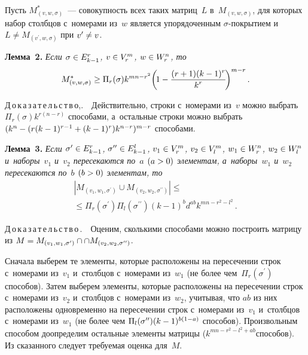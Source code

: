 \begin{multicols}{2}
    \smallskip
    
    Пусть $M_{(v,w,\sigma)}^*$~--- совокупность всех таких мат\-риц~$L$ 
в~$M_{(v,w,\sigma)}$, для которых набор столбцов с~номерами из~$w$ 
является упорядоченным $\sigma$-по\-кры\-ти\-ем и~$L\not= M_{(v^\prime, 
w,\sigma)}$ при $v^\prime\hm\not= v$. 
    
    \smallskip
    
    \noindent
    \textbf{Лемма~2.} \textit{Если $\sigma\hm\in E^r_{k-1}$, $v\hm\in V_r^m$, 
$w\hm\in W_r^n$, то} 
    $$
    M^*_{(v,w,\sigma)} \geq \Pi_r(\sigma) k^{mn-r^2}\!\left(\! 1-\displaystyle\frac{\displaystyle  (r+1)(k-
1)^r\mathstrut}{\displaystyle k^r\mathstrut}\!\right)^{m-r}.
    $$
    
    \noindent
    Д\,о\,к\,а\,з\,а\,т\,е\,л\,ь\,с\,т\,в\,о,.\ \ Действительно, строки 
с~номерами из~$v$ можно выбрать $\Pi_r(\sigma) k^{r(n-r)}$ способами, 
а~остальные строки можно выбрать $(k^n\hm- (r(k\hm-1)^{r-1} \hm+ (k\hm-
1)^r)k^{n-r})^{m-r}$ способами.
    
    \smallskip
    
    \noindent
    \textbf{Лемма~3.} \textit{Если $\sigma^\prime \hm\in E^r_{k-1}$, 
$\sigma^{\prime\prime} \hm\in E^l_{k-1}$, $v_1\hm\in V_r^m$, $v_2\hm\in 
V_l^m$, $w_1\hm\in W_r^n$, $w_2\hm\in W_l^n$ и~наборы~$v_1$ и~$v_2$ 
пересекаются по~$a$ $(a\hm>0)$ элементам, а~наборы~$w_1$ и~$w_2$ 
пересекаются по~$b$ $(b\hm>0)$ элементам, то}
\begin{multline*}
    \left\vert M_{(v_1, w_1,\sigma^\prime)} \cup 
M_{(v_2,w_2,\sigma^{\prime\prime})} \right\vert \leq{}\\
{}\leq \Pi_r(\sigma^\prime) \Pi_l 
(\sigma^{\prime\prime}) (k-1)^b d^{ab} k^{mn-r^2-l^2}\,.
    \end{multline*}
     
    \noindent
    Д\,о\,к\,а\,з\,а\,т\,е\,л\,ь\,с\,т\,в\,о\,.\ \ Оценим, сколькими способами 
можно построить матрицу из $M\hm= M_{(v_1, w_1, \sigma^\prime)}\cap\linebreak
\cap 
M_{(v_2, w_2, \sigma^{\prime\prime})}$. 
    
    Сначала выберем те элементы, которые расположены на пересечении 
строк с~номерами из~$v_1$ и~столбцов с~номерами из~$w_1$ (не более 
чем~$\Pi_r(\sigma^\prime)$ способов). Затем  выберем элементы, которые 
расположены на пересечении строк с~номерами из~$v_2$ и~столбцов 
с~номерами из~$w_2$, учитывая, что $ab$ из них расположены одновременно 
на пересечении строк с~номерами из~$v_1$ и~столбцов с~номерами из~$w_1$ 
(не более чем $\Pi_l(\sigma^{\prime\prime})(k\hm-1)^{b(1-a)}$ способов). 
Произвольным способом доопределим остальные элементы матрицы  
($k^{mn-r^2-l^2+ab}$способов). Из сказанного следует требуемая оценка 
для~$M$.
    

\end{multicols}
